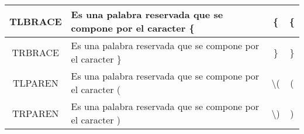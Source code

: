 \documentclass[12pt,a4paper, landscape]{article}
\theoremstyle{mytheor}
\begin{document}
\begin{longtable}[c]{|c|c|c|c|}
TLBRACE      & \multicolumn{1}{l|}{Es una palabra reservada que se compone por el caracter \{}                                                                                                                                                                                                                                                                                                                             & \{                                                                  & \{                                                                                                                                                                                                                                               \\ \hline
TRBRACE      & \multicolumn{1}{l|}{Es una palabra reservada que se compone por el caracter \}}                                                                                                                                                                                                                                                                                                                             & \}                                                                  & \}                                                                                                                                                                                                                                               \\ \hline
TLPAREN      & \multicolumn{1}{l|}{Es una palabra reservada que se compone por el caracter (}                                                                                                                                                                                                                                                                                                                              & \textbackslash{}(                                                   & (                                                                                                                                                                                                                                                \\ \hline
TRPAREN      & \multicolumn{1}{l|}{Es una palabra reservada que se compone por el caracter )}                                                                                                                                                                                                                                                                                                                              & \textbackslash{})                                                   & )                                                                                                                                                                                                                                                \\ \hline

\end{longtable}
\end{document}

